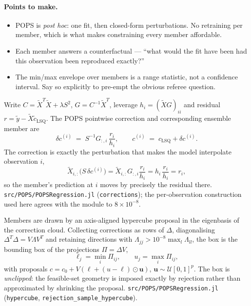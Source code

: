 \documentclass{article}
\newcommand{\code}[1]{\texttt{\small #1}}
\begin{document}
\paragraph{Points to make.}
\begin{itemize}
  \item POPS is \emph{post hoc}: one fit, then closed-form perturbations. No retraining per member, which is what makes constraining every member affordable.
  \item Each member answers a counterfactual --- ``what would the fit have been had this observation been reproduced exactly?''
  \item The min/max envelope over members is a range statistic, not a confidence interval. Say so explicitly to pre-empt the obvious referee question.
\end{itemize}

Write $C = \tilde X^{T}\tilde X + \lambda S^{2}$, $G = C^{-1}\tilde X^{T}$,
leverage $h_i = (\tilde X G)_{ii}$ and residual
$r = \tilde y - \tilde X\tilde c_{\mathrm{LSQ}}$. The POPS pointwise correction
and corresponding ensemble member are
\begin{equation}
  \delta c^{(i)} \;=\; S^{-1} G_{:,i}\,\frac{r_i}{h_i},
  \qquad
  c^{(i)} \;=\; c_{\mathrm{LSQ}} + \delta c^{(i)} .
  \label{eq:pops}
\end{equation}
The correction is exactly the perturbation that makes the model interpolate
observation $i$,
\begin{equation}
  \tilde X_{i,:}\bigl(S\,\delta c^{(i)}\bigr)
  = \tilde X_{i,:} G_{:,i}\frac{r_i}{h_i}
  = h_i\,\frac{r_i}{h_i} = r_i ,
  \label{eq:interp identity}
\end{equation}
so the member's prediction at $i$ moves by precisely the residual there.
\code{src/POPS/POPSRegression.jl} (\code{corrections}); the per-observation
construction used here agrees with the module to $8\times10^{-8}$.

Members are drawn by an axis-aligned hypercube proposal in the eigenbasis of the
correction cloud. Collecting corrections as rows of $\Delta$, diagonalising
$\Delta^{T}\Delta = V\Lambda V^{T}$ and retaining directions with
$\Lambda_{jj} > 10^{-8}\max_l\Lambda_{ll}$, the box is the bounding box of the
projections $\Pi = \Delta V$,
\begin{equation}
  \ell_j = \min_i \Pi_{ij}, \qquad u_j = \max_i \Pi_{ij},
  \label{eq:box}
\end{equation}
with proposals $c = c_0 + V(\ell + (u-\ell)\odot\bm u)$,
$\bm u \sim \mathcal{U}[0,1]^{p}$. The box is \emph{unclipped}: the feasible-set
geometry is imposed exactly by rejection rather than approximated by shrinking
the proposal. \code{src/POPS/POPSRegression.jl}
(\code{hypercube}, \code{rejection\_sample\_hypercube}).
\end{document}
